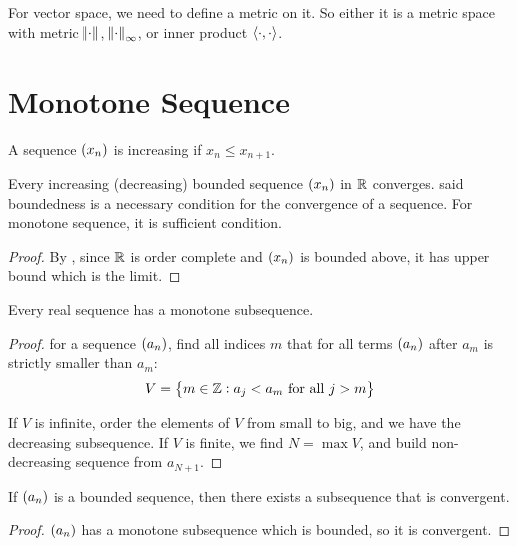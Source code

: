 For vector space, we need to define a metric on it. So either it is a metric space with metric $\length{\cdot}$, $\length{\cdot}_\infty$, or inner product $\innerproduct{\cdot}{\cdot}$.



%
%
%
%

\section{Monotone Sequence}

\begin{definition}
    A sequence $\sequence{x_n}$ is increasing if $x_n \leq x_{n+1}$.
\end{definition}


\begin{theorem}
    Every increasing (decreasing) bounded sequence $\sequence{x_n}$ in $\mathbb{R}$ converges.  said boundedness is a necessary condition for the convergence of a sequence. For monotone sequence, it is sufficient condition.
\end{theorem}
\begin{proof}
    By , since $\mathbb{R}$ is order complete and $\sequence{x_n}$ is bounded above, it has upper bound which is the limit.
\end{proof}


\begin{theorem}
    Every real sequence has a monotone subsequence.    
\end{theorem}
\begin{proof}
    for a sequence $\sequence{a_n}$, find all indices $m$ that for all terms $\sequence{a_n}$ after $a_m$ is strictly smaller than $a_m$:
    \begin{equation}
        V = \set{m \in \mathbb{Z}: a_j < a_m \text{ for all } j > m}
    \end{equation}
    
    If $V$ is infinite, order the elements of $V$ from small to big, and we have the decreasing subsequence. If $V$ is finite, we find $N = \max V$, and build non-decreasing sequence from $a_{N+1}$.
\end{proof}


\begin{theorem}
    If $\sequence{a_n}$ is a bounded sequence, then there exists a subsequence that is convergent.
\end{theorem}
\begin{proof}
    $\sequence{a_n}$ has a monotone subsequence which is bounded, so it is convergent.
\end{proof}




